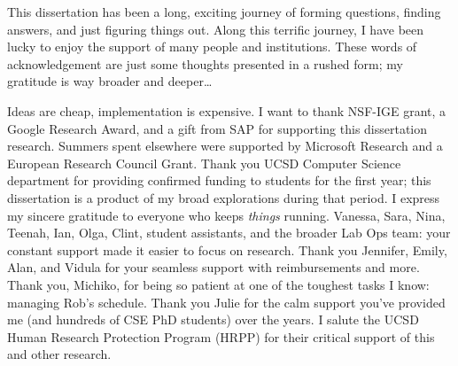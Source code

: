 \begin{frontmatter}
\begin{epigraph}
\vspace{10pt}




\end{epigraph}

%


%
\tableofcontents
\listoffigures  %



%
%
\begin{acknowledgements}
This dissertation has been a long, exciting journey of forming questions, finding answers, and just figuring things out. Along this terrific journey, I have been lucky to enjoy the support of many people and institutions. These words of acknowledgement are just some thoughts presented in a rushed form; my gratitude is way broader and deeper…

Ideas are cheap, implementation is expensive. I want to thank NSF-IGE grant, a Google Research Award, and a gift from SAP for supporting this dissertation research. Summers spent elsewhere were supported by Microsoft Research and a European Research Council Grant. Thank you UCSD Computer Science department for providing confirmed funding to students for the first year; this dissertation is a product of my broad explorations during that period. I express my sincere gratitude to everyone who keeps \textit{things} running. Vanessa, Sara, Nina, Teenah, Ian, Olga, Clint, student assistants, and the broader Lab Ops team: your constant support made it easier to focus on research. Thank you Jennifer, Emily, Alan, and Vidula for your seamless support with reimbursements and more. Thank you, Michiko, for being so patient at one of the toughest tasks I know: managing Rob’s schedule. Thank you Julie for the calm support you’ve provided me (and hundreds of CSE PhD students) over the years. I salute the UCSD Human Research Protection Program (HRPP) for their critical support of this and other research. 


\end{acknowledgements}
\end{frontmatter}

